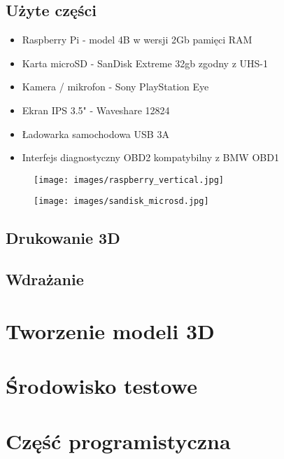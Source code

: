 \documentclass[declaration,shortabstract, inz]{iithesis}
\begin{document}
\subsection{Użyte części}
\begin{itemize}
  \item Raspberry Pi - model 4B w wersji 2Gb pamięci RAM
  \item Karta microSD - SanDisk Extreme 32gb zgodny z UHS-1
  \item Kamera / mikrofon - Sony PlayStation Eye
  \item Ekran IPS 3.5" - Waveshare 12824
  \item Ładowarka samochodowa USB 3A
  \item Interfejs diagnostyczny OBD2 kompatybilny z BMW OBD1
\end{itemize}
\begin{figure}[htp]
    \centering
    \texttt{[image: images/raspberry\_vertical.jpg]}
    \label{fig:rpi}
  \end{figure}
\begin{figure}[htp]
    \centering
    \texttt{[image: images/sandisk\_microsd.jpg]}
    \label{fig:microsd}
  \end{figure}
\subsection{Drukowanie 3D}
\subsection{Wdrażanie}
\section{Tworzenie modeli 3D}
\section{Środowisko testowe} %
\section{Część programistyczna}


\end{document}
